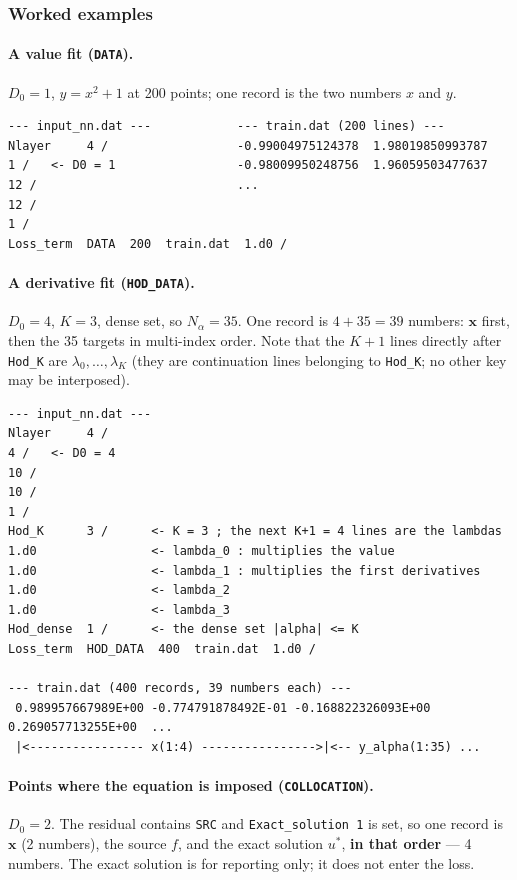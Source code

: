 \documentclass[10pt,a4paper]{article}
\newcommand{\code}[1]{\texttt{#1}}
\newcommand{\mi}[1]{\boldsymbol{#1}}
\begin{document}
\subsubsection{Worked examples}

\paragraph{A value fit (\code{DATA}).}
$D_0=1$, $y=x^2+1$ at 200 points; one record is the two numbers $x$
and $y$.

\begin{verbatim}
--- input_nn.dat ---            --- train.dat (200 lines) ---
Nlayer     4 /                  -0.99004975124378  1.98019850993787
1 /   <- D0 = 1                 -0.98009950248756  1.96059503477637
12 /                            ...
12 /
1 /
Loss_term  DATA  200  train.dat  1.d0 /
\end{verbatim}

\paragraph{A derivative fit (\code{HOD\_DATA}).}
$D_0=4$, $K=3$, dense set, so $N_\alpha=35$. One record is
$4+35=39$ numbers: $\mi{x}$ first, then the 35 targets in multi-index
order. Note that the $K+1$ lines directly after \code{Hod\_K} are
$\lambda_0,\dots,\lambda_K$ (they are continuation lines belonging to
\code{Hod\_K}; no other key may be interposed).

\begin{verbatim}
--- input_nn.dat ---
Nlayer     4 /
4 /   <- D0 = 4
10 /
10 /
1 /
Hod_K      3 /      <- K = 3 ; the next K+1 = 4 lines are the lambdas
1.d0                <- lambda_0 : multiplies the value
1.d0                <- lambda_1 : multiplies the first derivatives
1.d0                <- lambda_2
1.d0                <- lambda_3
Hod_dense  1 /      <- the dense set |alpha| <= K
Loss_term  HOD_DATA  400  train.dat  1.d0 /

--- train.dat (400 records, 39 numbers each) ---
 0.989957667989E+00 -0.774791878492E-01 -0.168822326093E+00  0.269057713255E+00  ...
 |<---------------- x(1:4) ---------------->|<-- y_alpha(1:35) ...
\end{verbatim}

\paragraph{Points where the equation is imposed (\code{COLLOCATION}).}
$D_0=2$. The residual contains \code{SRC} and
\code{Exact\_solution 1} is set, so one record is $\mi{x}$ (2
numbers), the source $f$, and the exact solution $u^*$, \textbf{in
that order} --- 4 numbers. The exact solution is for reporting only;
it does not enter the loss.
\end{document}
